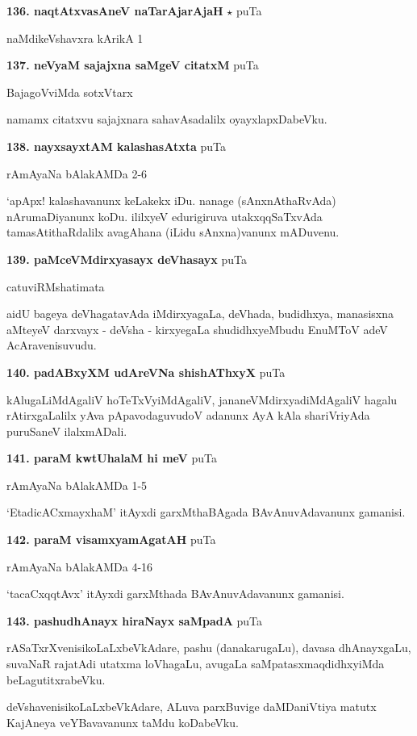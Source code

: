 \medskip
\noindent\textbf{136. naqtAtxvasAneV naTarAjarAjaH} $\star$ \hfill puTa \pageref{30}

\hfill naMdikeVshavxra kArikA 1

\medskip
\noindent\textbf{137. neVyaM sajajxna saMgeV citatxM} \hfill puTa \pageref{83}

\hfill BajagoVviMda sotxVtarx

namamx citatxvu sajajxnara sahavAsadalilx oyayxlapxDabeVku.

\medskip
\noindent\textbf{138. nayxsayxtAM kalashasAtxta} \hfill puTa \pageref{198}

\hfill rAmAyaNa bAlakAMDa 2-6

`apApx! kalashavanunx keLakekx iDu. nanage (sAnxnAthaRvAda) nArumaDiyanunx koDu. ililxyeV edurigiruva utakxqqSaTxvAda tamasAtithaRdalilx avagAhana (iLidu sAnxna)vanunx mADuvenu.

\medskip
\noindent\textbf{139. paMceVMdirxyasayx deVhasayx} \hfill puTa \pageref{139b}

\hfill catuviRMshatimata

aidU bageya deVhagatavAda iMdirxyagaLa, deVhada, budidhxya, manasisxna aMteyeV darxvayx - deVsha - kirxyegaLa shudidhxyeMbudu EnuMToV adeV AcAravenisuvudu. 

\medskip
\noindent\textbf{140. padABxyXM udAreVNa shishAThxyX} \hfill puTa \pageref{26}

kAlugaLiMdAgaliV hoTeTxVyiMdAgaliV, jananeVMdirxyadiMdAgaliV hagalu rAtirxgaLalilx yAva pApavodaguvudoV adanunx AyA kAla shariVriyAda puruSaneV ilalxmADali.

\medskip
\noindent\textbf{141. paraM kwtUhalaM hi meV} \hfill puTa \pageref{163}

\hfill rAmAyaNa bAlakAMDa 1-5

`EtadicACxmayxhaM' itAyxdi garxMthaBAgada BAvAnuvAdavanunx gamanisi.

\medskip
\noindent\textbf{142. paraM visamxyamAgatAH} \hfill puTa \pageref{211a}

\hfill rAmAyaNa bAlakAMDa 4-16

`tacaCxqqtAvx' itAyxdi garxMthada BAvAnuvAdavanunx gamanisi.

\medskip
\noindent\textbf{143. pashudhAnayx hiraNayx saMpadA} \hfill puTa \pageref{227}

rASaTxrXvenisikoLaLxbeVkAdare, pashu (danakarugaLu), davasa dhAnayxgaLu, suvaNaR rajatAdi utatxma loVhagaLu, avugaLa saMpatasxmaqdidhxyiMda beLagutitxrabeVku. 

deVshavenisikoLaLxbeVkAdare, ALuva parxBuvige daMDaniVtiya matutx KajAneya veYBavavanunx taMdu koDabeVku.

